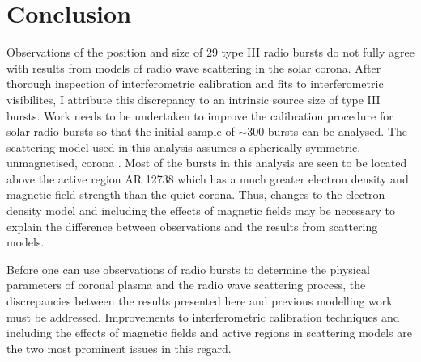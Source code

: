 
\section{Conclusion}
Observations of the position and size of 29 type III radio bursts do not fully agree with results from models of radio wave scattering in the solar corona. After thorough inspection of interferometric calibration and fits to interferometric visibilites, I attribute this discrepancy to an intrinsic source size of type III bursts. Work needs to be undertaken to improve the calibration procedure for solar radio bursts so that the initial sample of $\sim 300$ bursts can be analysed. 
The scattering model used in this analysis assumes a spherically symmetric, unmagnetised, corona \citep{Kontar2019, Zhang2021}. Most of the bursts in this analysis are seen to be located above the active region AR 12738 which has a much greater electron density and magnetic field strength than the quiet corona. Thus, changes to the electron density model and including the effects of magnetic fields may be necessary to explain the difference between observations and the results from scattering models.

Before one can use observations of radio bursts to determine the physical parameters of coronal plasma and the radio wave scattering process, the discrepancies between the results presented here and previous modelling work must be addressed. Improvements to interferometric calibration techniques and including the effects of magnetic fields and active regions in scattering models are the two most prominent issues in this regard. %

